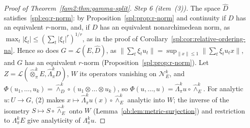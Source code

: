 \documentclass[11pt]{amsart}
\theoremstyle{definition}
\theoremstyle{remark}
\numberwithin{equation}{section}
\newcommand{\cL}{\mathcal L}
\newcommand{\abs}[1]{\lvert #1\rvert}
\newcommand{\norm}[1]{\lVert #1\rVert}
\theoremstyle{plain}
\theoremstyle{definition}
\theoremstyle{plain}
\newcommand{\hot}{\mathbin{\widehat\otimes}}
\newcommand{\hLambda}{\widehat\Lambda}
\newcommand{\cN}{\mathcal N}
\begin{document}
\begin{proof}[Proof of Theorem~\ref{fam2:thm:gamma-split}]
\emph{Step 6 (item~(3)).} The space $\widehat D$ satisfies~\eqref{spl:eq:r-norm}: by Proposition~\ref{spl:prop:r-norm} and
continuity if $D$ has an equivalent $r$-norm, and, if $D$ has an equivalent nonarchimedean norm, as
$\max_t\abs{\xi_t}\le(\sum_t\abs{\xi_t}^r)^{1/r}$, as in the proof of Corollary~\ref{spl:cor:relative-ordering-na}. Hence
so does $G=\cL(E,\widehat D)$, as $\norm{\sum_t\xi_tu_t}=\sup_{\norm x\le1}\norm{\sum_t\xi_tu_tx}$, and $G$ has an equivalent
$r$-norm (Proposition~\ref{spl:prop:r-norm}). Let $Z=\cL(\hot^k_\pi E,\hLambda^k_\pi D)$, $W$ its operators vanishing on
$\cN^k_E$, and $\Phi(u_1,\dots,u_k)=\widehat\wedge^k_D\circ(u_1\otimes\dots\otimes u_k)$, so $\Phi(u,\dots,u)=
\hLambda^k_\pi u\circ\widehat\wedge^k_E$. For analytic $u\colon U\to G$, (2) makes $x\mapsto\hLambda^k_\pi u(x)\circ
\widehat\wedge^k_E$ analytic into $W$; the inverse of the isometry $S\mapsto S\circ\widehat\wedge^k_E$ onto $W$
(Lemma~\ref{ob:lem:metric-surjection}) and restriction to $\Lambda^k_\pi E$ give analyticity of $\Lambda^k_\pi u$.
\end{proof}
\end{document}
